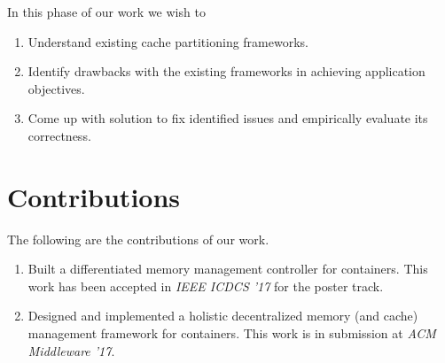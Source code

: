    \noindent In this phase of our work we wish to
      \begin{enumerate}
	\item Understand existing cache partitioning frameworks.
	\item Identify drawbacks with the existing frameworks in achieving application objectives.
	\item Come up with solution to fix identified issues and empirically evaluate its correctness.
      \end{enumerate}

  \section{Contributions}
    The following are the contributions of our work.  
      \begin{enumerate}
	\item Built a differentiated memory management controller for containers. This work\cite{prashanth2017} has been 
	accepted in \textit{IEEE ICDCS '17} for the poster track.
	\item Designed and implemented a holistic decentralized memory (and cache) management framework for containers. This work 
	is in submission at \textit{ACM Middleware '17}.
      \end{enumerate}

  